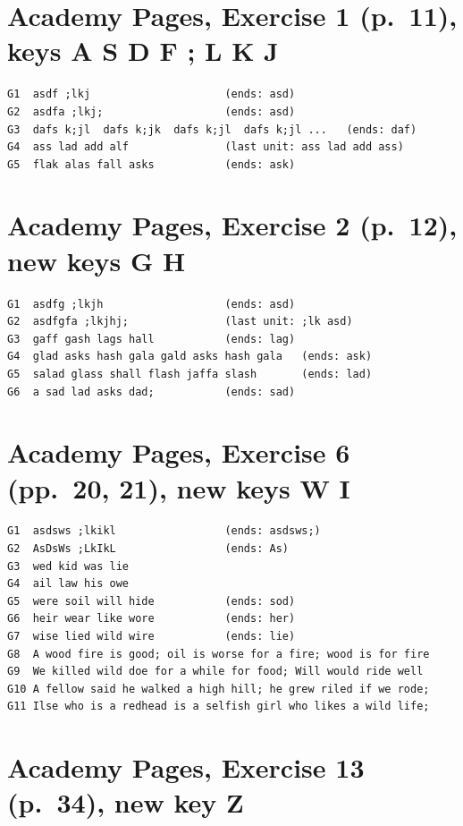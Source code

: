 \section{Academy Pages, Exercise 1 (p.\ 11), keys A S D F ; L K J}

\begin{Verbatim}
G1  asdf ;lkj                     (ends: asd)
G2  asdfa ;lkj;                   (ends: asd)
G3  dafs k;jl  dafs k;jk  dafs k;jl  dafs k;jl ...   (ends: daf)
G4  ass lad add alf               (last unit: ass lad add ass)
G5  flak alas fall asks           (ends: ask)
\end{Verbatim}

\section{Academy Pages, Exercise 2 (p.\ 12), new keys G H}

\begin{Verbatim}
G1  asdfg ;lkjh                   (ends: asd)
G2  asdfgfa ;lkjhj;               (last unit: ;lk asd)
G3  gaff gash lags hall           (ends: lag)
G4  glad asks hash gala gald asks hash gala   (ends: ask)
G5  salad glass shall flash jaffa slash       (ends: lad)
G6  a sad lad asks dad;           (ends: sad)
\end{Verbatim}

\section{Academy Pages, Exercise 6 (pp.\ 20, 21), new keys W I}

\begin{Verbatim}
G1  asdsws ;lkikl                 (ends: asdsws;)
G2  AsDsWs ;LkIkL                 (ends: As)
G3  wed kid was lie
G4  ail law his owe
G5  were soil will hide           (ends: sod)
G6  heir wear like wore           (ends: her)
G7  wise lied wild wire           (ends: lie)
G8  A wood fire is good; oil is worse for a fire; wood is for fire
G9  We killed wild doe for a while for food; Will would ride well
G10 A fellow said he walked a high hill; he grew riled if we rode;
G11 Ilse who is a redhead is a selfish girl who likes a wild life;
\end{Verbatim}

\section{Academy Pages, Exercise 13 (p.\ 34), new key Z}

